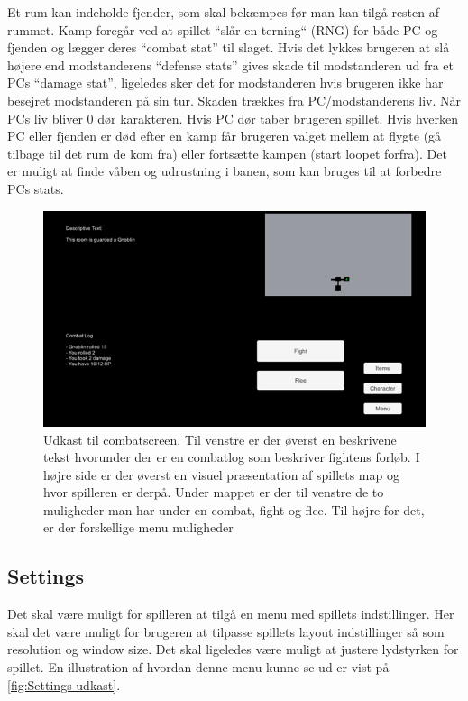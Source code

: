Et rum kan indeholde fjender, som skal bekæmpes før man kan tilgå resten af rummet. Kamp foregår ved at spillet “slår en terning“ (RNG) for både PC og fjenden og lægger deres “combat stat” til slaget. Hvis det lykkes brugeren at slå højere end modstanderens ``defense stats'' gives skade til modstanderen ud fra et PCs ``damage stat'', ligeledes sker det for modstanderen hvis brugeren ikke har besejret modstanderen på sin tur. Skaden trækkes fra PC/modstanderens liv. Når PCs liv bliver 0 dør karakteren. Hvis PC dør taber brugeren spillet. Hvis hverken PC eller fjenden er død efter en kamp får brugeren valget mellem at flygte (gå tilbage til det rum de kom fra) eller fortsætte kampen (start loopet forfra). 
Det er muligt at finde våben og udrustning i banen, som kan bruges til at forbedre PCs stats. 

\begin{figure}[H]
\centering
\includegraphics[width = \textwidth]{02-Body/Images/CombatScreen-udkast.png}
\caption{Udkast til combatscreen. Til venstre er der øverst en beskrivene tekst hvorunder der er en combatlog som beskriver fightens forløb. I højre side er der øverst en visuel præsentation af spillets map og hvor spilleren er derpå. Under mappet er der til venstre de to muligheder man har under en combat, fight og flee. Til højre for det, er der forskellige menu muligheder}
\label{fig:Combat-udkast}
\end{figure}

\subsection{Settings}
Det skal være muligt for spilleren at tilgå en menu med spillets indstillinger. Her skal det være muligt for brugeren at tilpasse spillets layout indstillinger så som resolution og window size. Det skal ligeledes være muligt at justere lydstyrken for spillet. En illustration af hvordan denne menu kunne se ud er vist på \autoref{fig:Settings-udkast}.


